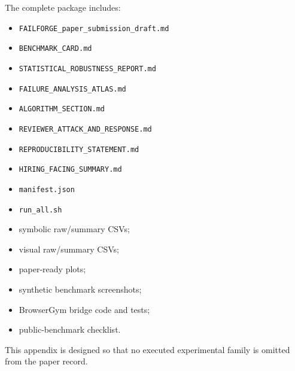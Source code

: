 \documentclass[
]{article}
\providecommand{\tightlist}{%
  \setlength{\itemsep}{0pt}\setlength{\parskip}{0pt}}
\begin{document}
The complete package includes:

\begin{itemize}
\tightlist
\item
  \texttt{FAILFORGE\_paper\_submission\_draft.md}
\item
  \texttt{BENCHMARK\_CARD.md}
\item
  \texttt{STATISTICAL\_ROBUSTNESS\_REPORT.md}
\item
  \texttt{FAILURE\_ANALYSIS\_ATLAS.md}
\item
  \texttt{ALGORITHM\_SECTION.md}
\item
  \texttt{REVIEWER\_ATTACK\_AND\_RESPONSE.md}
\item
  \texttt{REPRODUCIBILITY\_STATEMENT.md}
\item
  \texttt{HIRING\_FACING\_SUMMARY.md}
\item
  \texttt{manifest.json}
\item
  \texttt{run\_all.sh}
\item
  symbolic raw/summary CSVs;
\item
  visual raw/summary CSVs;
\item
  paper-ready plots;
\item
  synthetic benchmark screenshots;
\item
  BrowserGym bridge code and tests;
\item
  public-benchmark checklist.
\end{itemize}

This appendix is designed so that no executed experimental family is
omitted from the paper record.
\end{document}
